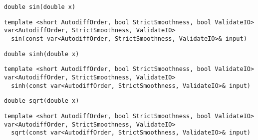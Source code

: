 \begin{tcolorbox}[colback=white,colframe=gray90, coltitle=black,boxrule=3pt,
fonttitle=\bfseries,title= Sin]

\begin{verbatim}
double sin(double x)

\end{verbatim}

\begin{verbatim}
template <short AutodiffOrder, bool StrictSmoothness, bool ValidateIO>
var<AutodiffOrder, StrictSmoothness, ValidateIO>
  sin(const var<AutodiffOrder, StrictSmoothness, ValidateIO>& input)

\end{verbatim}

\end{tcolorbox}

\begin{tcolorbox}[colback=white,colframe=gray90, coltitle=black,boxrule=3pt,
fonttitle=\bfseries,title= Sinh]

\begin{verbatim}
double sinh(double x)

\end{verbatim}

\begin{verbatim}
template <short AutodiffOrder, bool StrictSmoothness, bool ValidateIO>
var<AutodiffOrder, StrictSmoothness, ValidateIO>
  sinh(const var<AutodiffOrder, StrictSmoothness, ValidateIO>& input)

\end{verbatim}

\end{tcolorbox}

\begin{tcolorbox}[colback=white,colframe=gray90, coltitle=black,boxrule=3pt,
fonttitle=\bfseries,title= Sqrt]

\begin{verbatim}
double sqrt(double x)

\end{verbatim}

\begin{verbatim}
template <short AutodiffOrder, bool StrictSmoothness, bool ValidateIO>
var<AutodiffOrder, StrictSmoothness, ValidateIO>
  sqrt(const var<AutodiffOrder, StrictSmoothness, ValidateIO>& input)

\end{verbatim}

\end{tcolorbox}

